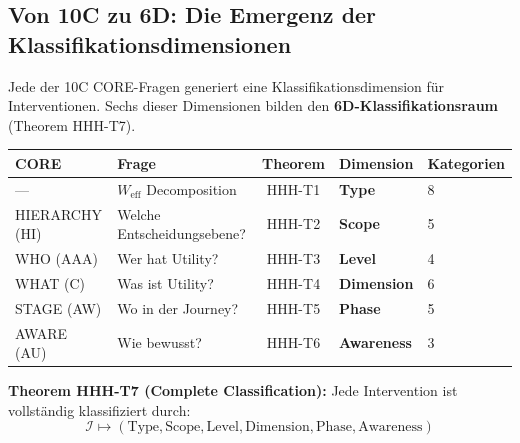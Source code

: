 \subsection{Von 10C zu 6D: Die Emergenz der Klassifikationsdimensionen}
\label{sec:17-emergence}

Jede der 10C CORE-Fragen generiert eine Klassifikationsdimension für Interventionen. Sechs dieser Dimensionen bilden den \textbf{6D-Klassifikationsraum} (Theorem HHH-T7).

\begin{tcolorbox}[colback=blue!5!white, colframe=blue!75!black,
    title=\textbf{Die 6D-Emergenz aus 10C}]

\begin{center}
\renewcommand{\arraystretch}{1.3}
\begin{tabular}{@{}llcll@{}}
\toprule
\textbf{CORE} & \textbf{Frage} & \textbf{Theorem} & \textbf{Dimension} & \textbf{Kategorien} \\
\midrule
--- & $W_{\text{eff}}$ Decomposition & HHH-T1 & \textbf{Type} & 8 \\
HIERARCHY (HI) & Welche Entscheidungsebene? & HHH-T2 & \textbf{Scope} & 5 \\
WHO (AAA) & Wer hat Utility? & HHH-T3 & \textbf{Level} & 4 \\
WHAT (C) & Was ist Utility? & HHH-T4 & \textbf{Dimension} & 6 \\
STAGE (AW) & Wo in der Journey? & HHH-T5 & \textbf{Phase} & 5 \\
AWARE (AU) & Wie bewusst? & HHH-T6 & \textbf{Awareness} & 3 \\
\bottomrule
\end{tabular}
\end{center}

\textbf{Theorem HHH-T7 (Complete Classification):} Jede Intervention ist vollständig klassifiziert durch:
\begin{equation}
\boxed{\mathcal{I} \mapsto (\text{Type}, \text{Scope}, \text{Level}, \text{Dimension}, \text{Phase}, \text{Awareness})}
\label{eq:17-6d-classification}
\end{equation}

\end{tcolorbox}

